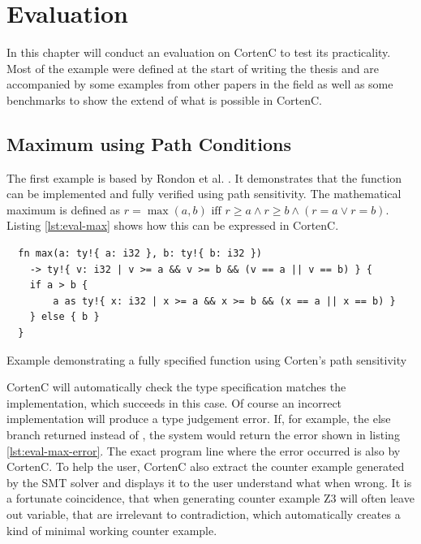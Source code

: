 \documentclass[twoside, english, final]{sdqthesis}
\theoremstyle{definition}
\begin{document}

\chapter{Evaluation} \label{ch:evaluation}

In this chapter will conduct an evaluation on CortenC to test its practicality. 
Most of the example were defined at the start of writing the thesis and are accompanied by some examples from other papers in the field as well as some benchmarks to show the extend of what is possible in CortenC.

\section{Maximum using Path Conditions}\label{sec:eval-max}

The first example is based by Rondon et al. \cite{rondon_liquid_2008}. It demonstrates that the  function can be implemented and fully verified using path sensitivity. The mathematical maximum is defined as $r = \max(a, b) \text{ iff } r \geq a \wedge r \geq b \wedge (r = a \vee r = b)$. Listing \ref{lst:eval-max} shows how this can be expressed in CortenC.


\begin{listing}[h]
  \begin{verbatim}
  fn max(a: ty!{ a: i32 }, b: ty!{ b: i32 }) 
    -> ty!{ v: i32 | v >= a && v >= b && (v == a || v == b) } {
    if a > b {
        a as ty!{ x: i32 | x >= a && x >= b && (x == a || x == b) }
    } else { b }
  }
  \end{verbatim}
  \caption{Example demonstrating a fully specified  function using Corten's path sensitivity}
  \label{lst:eval-max}
\end{listing}

CortenC will automatically check the type specification matches the implementation, which succeeds in this case.
Of course an incorrect implementation will produce a type judgement error. If, for example, the else branch returned  instead of , the system would return the error shown in listing \ref{lst:eval-max-error}. The exact program line where the error occurred is also by CortenC. To help the user, CortenC also extract the counter example generated by the SMT solver and displays it to the user understand what when wrong. It is a fortunate coincidence, that when generating counter example Z3 will often leave out variable, that are irrelevant to contradiction, which automatically creates a kind of minimal working counter example.
\end{document}
